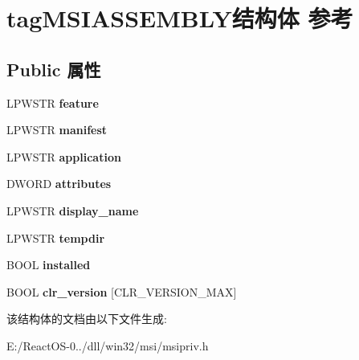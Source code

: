 \hypertarget{structtag_m_s_i_a_s_s_e_m_b_l_y}{}\section{tag\+M\+S\+I\+A\+S\+S\+E\+M\+B\+L\+Y结构体 参考}
\label{structtag_m_s_i_a_s_s_e_m_b_l_y}
\subsection*{Public 属性}
\begin{DoxyCompactItemize}
\item 
\mbox{\label{structtag_m_s_i_a_s_s_e_m_b_l_y_a7d4f3a711db7418eb1dff4aac439fdc7}} 
L\+P\+W\+S\+TR {\bfseries feature}
\item 
\mbox{\label{structtag_m_s_i_a_s_s_e_m_b_l_y_ad129262940c3ba6990470864701d8395}} 
L\+P\+W\+S\+TR {\bfseries manifest}
\item 
\mbox{\label{structtag_m_s_i_a_s_s_e_m_b_l_y_ae4168ac86ff2bf9d13312dc7f951edf9}} 
L\+P\+W\+S\+TR {\bfseries application}
\item 
\mbox{\label{structtag_m_s_i_a_s_s_e_m_b_l_y_a70642b4c191fabe81519be579b1e0ba8}} 
D\+W\+O\+RD {\bfseries attributes}
\item 
\mbox{\label{structtag_m_s_i_a_s_s_e_m_b_l_y_a9e9737fbb91b1af75b4d731cb739bdfd}} 
L\+P\+W\+S\+TR {\bfseries display\+\_\+name}
\item 
\mbox{\label{structtag_m_s_i_a_s_s_e_m_b_l_y_a7c531ea0ddc0e3b24eaff7046a61f010}} 
L\+P\+W\+S\+TR {\bfseries tempdir}
\item 
\mbox{\label{structtag_m_s_i_a_s_s_e_m_b_l_y_ad19f2f12f946766aa82bc354a161ffa2}} 
B\+O\+OL {\bfseries installed}
\item 
\mbox{\label{structtag_m_s_i_a_s_s_e_m_b_l_y_a1316e07ca71e5d9146a17c7e5c360db2}} 
B\+O\+OL {\bfseries clr\+\_\+version} \mbox{[}C\+L\+R\+\_\+\+V\+E\+R\+S\+I\+O\+N\+\_\+\+M\+AX\mbox{]}
\end{DoxyCompactItemize}


该结构体的文档由以下文件生成\+:\begin{DoxyCompactItemize}
\item 
E\+:/\+React\+O\+S-\/0../dll/win32/msi/msipriv.\+h\end{DoxyCompactItemize}
